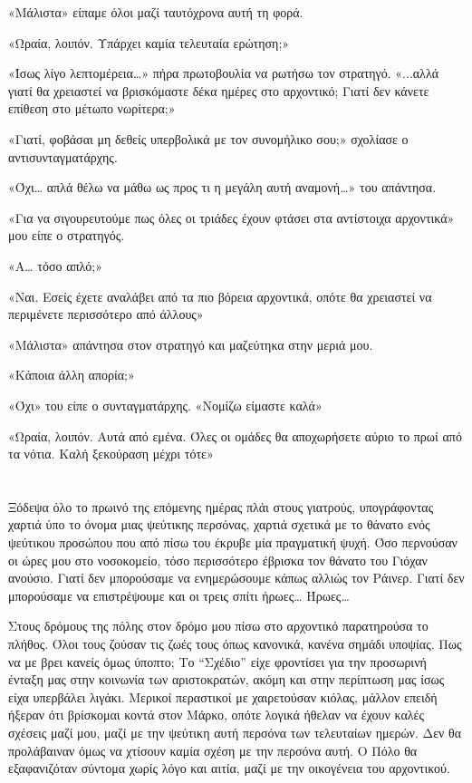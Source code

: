 \documentclass[12pt,twoside, openany]{book}
\begin{document}
«Μάλιστα» είπαμε όλοι μαζί ταυτόχρονα αυτή τη φορά.

«Ωραία, λοιπόν. Υπάρχει καμία τελευταία ερώτηση;»

«Ίσως λίγο λεπτομέρεια…» πήρα πρωτοβουλία να ρωτήσω τον στρατηγό. «...αλλά γιατί θα χρειαστεί να βρισκόμαστε δέκα ημέρες στο αρχοντικό; Γιατί δεν κάνετε επίθεση στο μέτωπο νωρίτερα;»

«Γιατί, φοβάσαι μη δεθείς υπερβολικά με τον συνομήλικο σου;» σχολίασε ο αντισυνταγματάρχης.

«Όχι… απλά θέλω να μάθω ως προς τι η μεγάλη αυτή αναμονή…» του απάντησα.

«Για να σιγουρευτούμε πως όλες οι τριάδες έχουν φτάσει στα αντίστοιχα αρχοντικά» μου είπε ο στρατηγός.

«Α… τόσο απλό;»

«Ναι. Εσείς έχετε αναλάβει από τα πιο βόρεια αρχοντικά, οπότε θα χρειαστεί να περιμένετε περισσότερο από άλλους»

«Μάλιστα» απάντησα στον στρατηγό και μαζεύτηκα στην μεριά μου.

«Κάποια άλλη απορία;»

«Όχι» του είπε ο συνταγματάρχης. «Νομίζω είμαστε καλά»

«Ωραία, λοιπόν. Αυτά από εμένα. Όλες οι ομάδες θα αποχωρήσετε αύριο το πρωί από τα νότια. Καλή ξεκούραση μέχρι τότε»


\chapter{}

Ξόδεψα όλο το πρωινό της επόμενης ημέρας πλάι στους  γιατρούς, υπογράφοντας χαρτιά ύπο το όνομα μιας ψεύτικης περσόνας, χαρτιά σχετικά με το θάνατο ενός ψεύτικου προσώπου που από πίσω του έκρυβε μία πραγματική ψυχή. Όσο περνούσαν οι ώρες μου στο νοσοκομείο, τόσο περισσότερο έβρισκα τον θάνατο του Γιόχαν ανούσιο. Γιατί δεν μπορούσαμε να ενημερώσουμε κάπως αλλιώς τον Ράινερ. Γιατί δεν μπορούσαμε να επιστρέψουμε και οι τρεις σπίτι ήρωες… Ήρωες…

Στους δρόμους της πόλης στον δρόμο μου πίσω στο αρχοντικό παρατηρούσα το πλήθος. Όλοι τους ζούσαν τις ζωές τους όπως κανονικά, κανένα σημάδι υποψίας. Πως να με βρει κανείς όμως ύποπτο; Το “Σχέδιο” είχε φροντίσει για την προσωρινή ένταξη μας στην κοινωνία των αριστοκρατών, ακόμη και στην περίπτωση μας ίσως είχα υπερβάλει λιγάκι. Μερικοί περαστικοί με χαιρετούσαν κιόλας, μάλλον επειδή ήξεραν ότι βρίσκομαι κοντά στον Μάρκο, οπότε λογικά ήθελαν να έχουν καλές σχέσεις μαζί μου, μαζί με την ψεύτικη αυτή περσόνα των τελευταίων ημερών. Δεν θα προλάβαιναν όμως να χτίσουν καμία σχέση με την περσόνα αυτή. Ο Πόλο θα εξαφανιζόταν σύντομα χωρίς λόγο και αιτία, μαζί με την οικογένεια του αρχοντικού.
\end{document}

